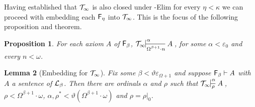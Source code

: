 \documentclass[UKenglish,cleveref,DIV=12]{scrartcl}
\newtheorem{lemma}{Lemma}
\newtheorem{proposition}[lemma]{Proposition}
\theoremstyle{definition}
\theoremstyle{definition}
\begin{document}
Having established that $\mathcal{T}_\infty$ is also closed under \textT\eta-Elim for every
$\eta<\kappa$ we can proceed with embedding each $\mathsf{F}_\eta$ into $\mathcal{T}_\infty$. This
is the focus of the following proposition and theorem.
\begin{proposition}\label{extprop:T8embed}
 For each axiom $A$ of $\mathsf{F}_\beta$, $\Tinfty\prov\alpha{\Omega^{\beta+1}\cdot n}A$, for some $\alpha<\varepsilon_0$ and every $n<\omega$.
\end{proposition}
%
\begin{lemma}[Embedding  for $\mathcal{T}_\infty$]\label{extthm:T8Embed}
Fix some $\beta<\vartheta\varepsilon_{\Omega+1}$ and suppose $\mathsf{F}_\beta\vdash A$ with $A$ a sentence of $\mathcal{L}_\beta$. Then there are ordinals $\alpha$ and $\rho$ such that $\Tinfty\prov\alpha\rho A$, $\rho<\Omega^{\beta+1}\cdot \omega$,  $\alpha,\rho^*<\vartheta(\Omega^{\beta+1}\cdot \omega)$ and $\rho=\rho|_0$.
\end{lemma}
\end{document}
